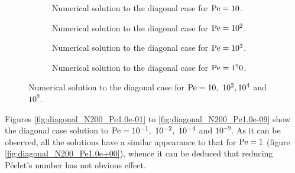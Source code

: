\begin{figure}[h]
	\centering
	\begin{subfigure}{.5\textwidth}
		\centering
		\vspace{-0.75cm}
		
		\vspace{-0.50cm}
		\captionsetup{width=0.8\textwidth}
		\caption{Numerical solution to the diagonal case for $\mathrm{Pe} = 10$.}
		\label{fig:diagonal_N200_Pe1.0e+01}
	\end{subfigure}%
	\begin{subfigure}{.5\textwidth}
		\centering
		\vspace{-0.75cm}
		
		\vspace{-0.50cm}
		\captionsetup{width=0.8\textwidth}
		\caption{Numerical solution to the diagonal case for $\mathrm{Pe} = 10^2$.}
		\label{fig:diagonal_N200_Pe1.0e+02}
	\end{subfigure}
	\begin{subfigure}{.5\textwidth}
		\centering
		\vspace{-0.25cm}
		
		\vspace{-0.50cm}
		\captionsetup{width=0.8\textwidth}
		\caption{Numerical solution to the diagonal case for $\mathrm{Pe} = 10^3$.}
		\label{fig:diagonal_N200_Pe1.0e+04}
	\end{subfigure}%
	\begin{subfigure}{.5\textwidth}
		\centering
		\vspace{-0.25cm}
		
		\vspace{-0.50cm}
		\captionsetup{width=0.8\textwidth}
		\caption{Numerical solution to the diagonal case for $\mathrm{Pe} = 1^90$.}
		\label{fig:diagonal_N200_Pe1.0e+09}
	\end{subfigure}%
	\caption{Numerical solution to the diagonal case for $\mathrm{Pe} = 10, \ 10^2, 10^4$ and $10^9$.}
	\label{fig:diagonal_N200_Pe_greater_than_1}
\end{figure}

\clearpage
Figures \ref{fig:diagonal_N200_Pe1.0e-01} to \ref{fig:diagonal_N200_Pe1.0e-09}
show the diagonal case solution to $\mathrm{Pe} = 10^{-1}, \ 10^{-2}, \ 10^{-4}$ and
$10^{-9}$. As it can be observed, all the solutions have a similar appearance to
that for $\mathrm{Pe} = 1$ (figure \ref{fig:diagonal_N200_Pe1.0e+00}), whence it can
be deduced that reducing Péclet's number has not obvious effect.

